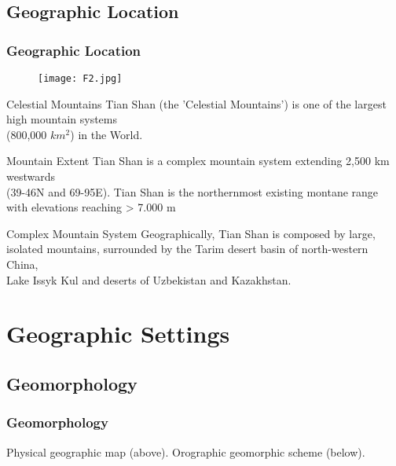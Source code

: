 \documentclass[pdflatex,compress,8pt,
	xcolor={dvipsnames,dvipsnames,svgnames,x11names,table},
	hyperref={colorlinks = true,
	breaklinks = true, 
	urlcolor = NavyBlue, 
	breaklinks = true}]{beamer}
\begin{document}
\subsection{Geographic Location}
\begin{frame}\frametitle{Geographic Location}


\begin{figure}[H]
	\centering
		\texttt{[image: F2.jpg]}
\end{figure}

\begin{alertblock}{Celestial Mountains}
Tian Shan (the 'Celestial Mountains’) is one of the largest high mountain systems \\(800,000 $km^{2}$) in the World.
\end{alertblock}

\begin{block}{Mountain Extent}
Tian Shan is a complex mountain system extending 2,500 km westwards\\ (39-46\degree N and 69-95\degree E). Tian Shan is the northernmost existing montane range with elevations reaching > 7.000 m
\end{block}

\begin{examples}{Complex Mountain System}
Geographically, Tian Shan is composed by large, \\isolated mountains, surrounded by the Tarim desert basin of north-western China, \\Lake Issyk Kul and deserts of Uzbekistan and Kazakhstan.
\end{examples}

\end{frame}

\section{Geographic Settings}
\subsection{Geomorphology}
\begin{frame}\frametitle{Geomorphology}
\begin{figure}[H]
	\centering
			\vspace{1mm}
\end{figure}
\tiny{Physical geographic map (above). Orographic geomorphic scheme (below).}
\end{frame}
\end{document}
